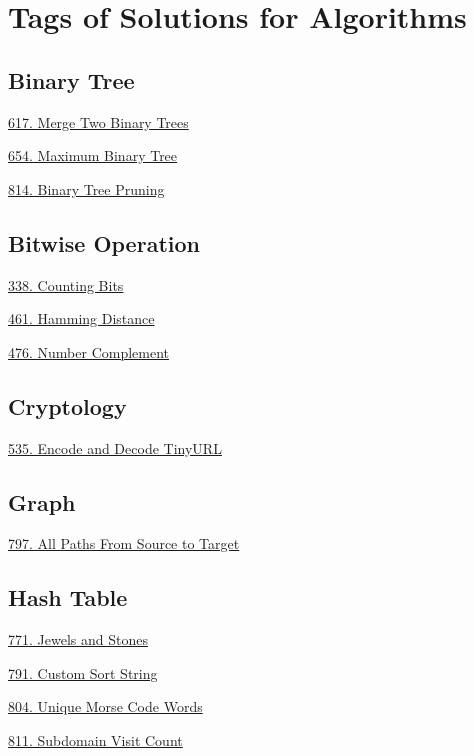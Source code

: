 \tocless\section{Tags of Solutions for Algorithms}
\label{sec:algo_tag}

\subsection*{Binary Tree}
\begin{flushleft}
    \hyperref[algo:617]{617. Merge Two Binary Trees}

    \hyperref[algo:654]{654. Maximum Binary Tree}

    \hyperref[algo:814]{814. Binary Tree Pruning}
\end{flushleft}

\subsection*{Bitwise Operation}
\begin{flushleft}
    \hyperref[algo:338]{338. Counting Bits}

    \hyperref[algo:461]{461. Hamming Distance}
    
    \hyperref[algo:476]{476. Number Complement}
\end{flushleft}

\subsection*{Cryptology}
\begin{flushleft}
    \hyperref[algo:535]{535. Encode and Decode TinyURL}
\end{flushleft}

\subsection*{Graph}
\begin{flushleft}
    \hyperref[algo:797]{797. All Paths From Source to Target}
\end{flushleft}

\subsection*{Hash Table}
\begin{flushleft}
    \hyperref[algo:771]{771. Jewels and Stones}
    
    \hyperref[algo:791]{791. Custom Sort String}
    
    \hyperref[algo:804]{804. Unique Morse Code Words}
    
    \hyperref[algo:811]{811. Subdomain Visit Count}
\end{flushleft}

